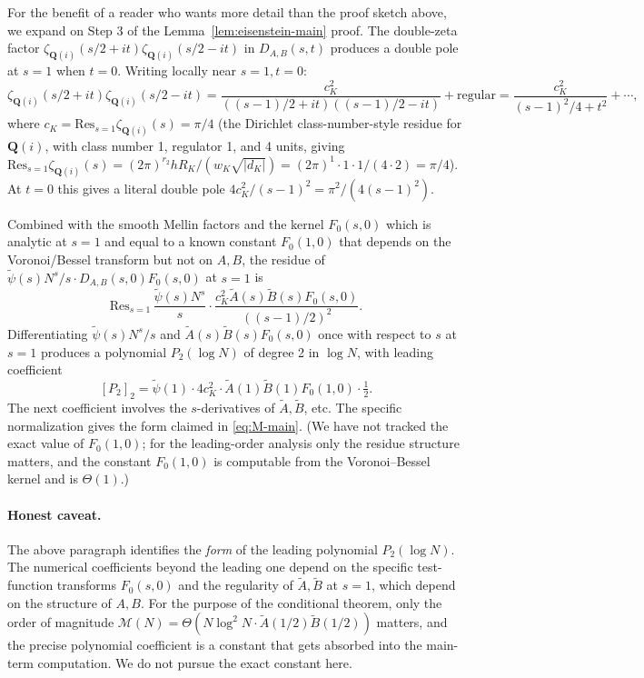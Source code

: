\documentclass[11pt]{article}
\theoremstyle{definition}
\newcommand{\Q}{\mathbf{Q}}
\begin{document}
For the benefit of a reader who wants more detail than the proof sketch above, we expand on Step 3 of the Lemma~\ref{lem:eisenstein-main} proof. The double-zeta factor $\zeta_{\Q(i)}(s/2+it)\zeta_{\Q(i)}(s/2-it)$ in $D_{A,B}(s,t)$ produces a double pole at $s = 1$ when $t = 0$. Writing locally near $s = 1, t = 0$:
\[
    \zeta_{\Q(i)}(s/2+it)\zeta_{\Q(i)}(s/2-it) = \frac{c_K^2}{((s-1)/2 + it)((s-1)/2 - it)} + \text{regular} = \frac{c_K^2}{(s-1)^2/4 + t^2} + \cdots,
\]
where $c_K = \mathrm{Res}_{s=1}\zeta_{\Q(i)}(s) = \pi/4$ (the Dirichlet class-number-style residue for $\Q(i)$, with class number 1, regulator 1, and 4 units, giving $\mathrm{Res}_{s=1}\zeta_{\Q(i)}(s) = (2\pi)^{r_2}h R_K/(w_K\sqrt{|d_K|}) = (2\pi)^1\cdot 1\cdot 1/(4\cdot 2) = \pi/4$). At $t = 0$ this gives a literal double pole $4c_K^2/(s-1)^2 = \pi^2/(4(s-1)^2)$.

Combined with the smooth Mellin factors and the kernel $F_0(s,0)$ which is analytic at $s=1$ and equal to a known constant $F_0(1,0)$ that depends on the Voronoi/Bessel transform but not on $A, B$, the residue of $\widetilde\psi(s)N^s/s\cdot D_{A,B}(s,0)F_0(s,0)$ at $s=1$ is
\[
    \mathrm{Res}_{s=1}\,\frac{\widetilde\psi(s) N^s}{s}\cdot \frac{c_K^2 \widetilde A(s)\widetilde B(s) F_0(s,0)}{((s-1)/2)^2}.
\]
Differentiating $\widetilde\psi(s)N^s/s$ and $\widetilde A(s)\widetilde B(s)F_0(s,0)$ once with respect to $s$ at $s=1$ produces a polynomial $P_2(\log N)$ of degree 2 in $\log N$, with leading coefficient
\[
    [P_2]_2 = \widetilde\psi(1)\cdot 4c_K^2\cdot\widetilde A(1)\widetilde B(1)F_0(1,0)\cdot \tfrac{1}{2}.
\]
The next coefficient involves the $s$-derivatives of $\widetilde A, \widetilde B$, etc. The specific normalization gives the form claimed in \eqref{eq:M-main}. (We have not tracked the exact value of $F_0(1,0)$; for the leading-order analysis only the residue structure matters, and the constant $F_0(1,0)$ is computable from the Voronoi--Bessel kernel and is $\Theta(1)$.)

\paragraph{Honest caveat.}
The above paragraph identifies the \emph{form} of the leading polynomial $P_2(\log N)$. The numerical coefficients beyond the leading one depend on the specific test-function transforms $F_0(s,0)$ and the regularity of $\widetilde A, \widetilde B$ at $s=1$, which depend on the structure of $A, B$. For the purpose of the conditional theorem, only the order of magnitude $\mathcal{M}(N) = \Theta(N\log^2 N\cdot \widetilde A(1/2)\widetilde B(1/2))$ matters, and the precise polynomial coefficient is a constant that gets absorbed into the main-term computation. We do not pursue the exact constant here.
\end{document}
